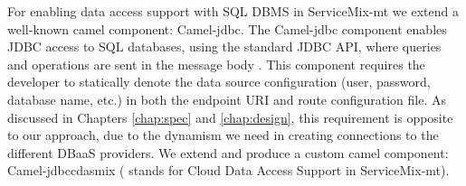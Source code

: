 For enabling data access support with \ac{SQL} \ac{DBMS} in ServiceMix-mt we extend a well-known camel component: Camel-jdbc. The Camel-jdbc component enables \ac{JDBC} access to \ac{SQL} databases, using the standard \ac{JDBC} API, where queries and operations are sent in the message body \cite{cameljdbc}. This component requires the developer to statically denote the data source configuration (user, password, database name, etc.) in both the endpoint \ac{URI} and route configuration file. As discussed in Chapters \ref{chap:spec} and \ref{chap:design}, this requirement is opposite to our approach, due to the dynamism we need in creating connections to the different \ac{DBaaS} providers. We extend and produce a custom camel component: Camel-jdbccdasmix ( stands for Cloud Data Access Support in ServiceMix-mt).

\FloatBarrier
